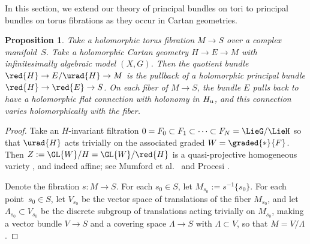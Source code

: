 \documentclass[10pt,a4paper]{amsart}
\numberwithin{equation}{section}
\newtheorem{Proposition}[Theorem]{Proposition}
\begin{document}
In this section, we extend our theory of principal bundles on tori to principal bundles on torus fibrations as they occur in Cartan geometries.
\begin{Proposition}\label{proposition:torus.fibration}
Take a holomorphic torus fibration $M \to S$ over a complex manifold~$S$.
Take a holomorphic Cartan geometry $H \to E \to M$ with infinitesimally algebraic model $(X, G)$.
Then the quotient bundle $\red{H}\to E/\urad{H} \to M$ is the pullback of a holomorphic principal bundle $\red{H} \to \red{E} \to S$.
On each fiber of $M \to S$, the bundle $E$ pulls back to have a holomorphic flat connection with holonomy in $H_{\rm u}$, and this connection varies holomorphically with the fiber.
\end{Proposition}

\begin{proof}
Take an $H$-invariant filtration $0 = F_0 \subset F_1 \subset \dots \subset F_N = \LieG/\LieH$ so
that $\urad{H}$ acts trivially on the associated graded $W=\graded{*}{F}$.
Then $Z := \GL{W}/H = \GL{W}/\red{H}$ is a quasi-projective homogeneous variety
\cite[Theorem 12.2.1]{Springer:2009}, and indeed affine; see Mumford et al.\
\cite[Theorem~1.1]{Mumford/Fogarty/Kirwan:1994} and Procesi \cite[Theorem 2]{Procesi:2007}.

Denote the fibration $s \colon M \to S$.
For each $s_0 \in S$, let $M_{s_0} := s^{-1}\{s_0\}$.
For each point~${s_0 \in S}$, let $V_{s_0}$ be the vector space of translations of the fiber $M_{s_0}$, and let $\Lambda_{s_0}
 \subset V_{s_0}$ be the discrete subgroup of translations acting trivially on $M_{s_0}$, making a vector bundle $V \to S$ and a covering space $\Lambda \to S$ with $\Lambda \subset V$, so that $M=V/\Lambda$.


\end{proof}
\end{document}
